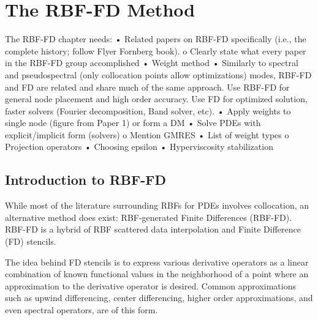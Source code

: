 \documentclass[11pt]{report}
\begin{document}
\fi

{ \graphicspath{{rbffd_methods_content/}} 



% 

\part{The RBF-FD Method}
The RBF-FD chapter needs:
•	Related papers on RBF-FD specifically (i.e., the complete history; follow Flyer Fornberg book). 
o	Clearly state what every paper in the RBF-FD group accomplished
•	Weight method
•	Similarly to spectral and pseudospectral (only collocation points allow optimizations) modes, RBF-FD and FD are related and share much of the same approach. Use RBF-FD for general node placement and high order accuracy. Use FD for optimized solution, faster solvers (Fourier decomposition, Band solver, etc). 
•	Apply weights to single node (figure from Paper 1) or form a DM
•	Solve PDEs with explicit/implicit form (solvers)
o	Mention GMRES
•	List of weight types
o	Projection operators
•	Choosing epsilon
•	Hyperviscosity stabilization

\chapter{Introduction to RBF-FD}

While most of the literature surrounding RBFs for PDEs involves collocation, an alternative method does exist: RBF-generated Finite Differences (RBF-FD). RBF-FD is a hybrid of RBF scattered data interpolation and Finite Difference (FD) stencils. 

The idea behind FD stencils is to express various derivative operators as a linear combination of known functional values in the neighborhood of a point where an approximation to the derivative operator is desired. Common approximations such as upwind differencing, center differencing, higher order approximations, and even spectral operators, are of this form. 

}
\end{document}
